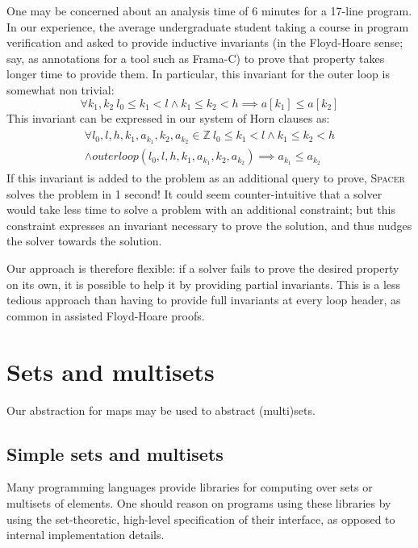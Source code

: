 \documentclass[a4paper]{article}
\newcommand{\ZZ}{\mathbb{Z}}
\newcommand{\soft}[1]{\textsc{#1}}
\theoremstyle{definition}
\theoremstyle{plain}
\begin{document}
One may be concerned about an analysis time of 6 minutes for a 17-line program.
In our experience, the average undergraduate student taking a course in program verification and asked to provide inductive invariants (in the Floyd-Hoare sense; say, as annotations for a tool such as Frama-C) to prove that property takes longer time to provide them.
In particular, this invariant for the outer loop is somewhat non trivial:
\begin{equation}
\forall k_1,k_2~ l_0 \leq k_1 < l \land k_1 \leq k_2 < h
\implies a[k_1] \leq a[k_2]
\end{equation}
This invariant can be expressed in our system of Horn clauses as:
\begin{align}
\begin{aligned}
\forall l_0,l,h,k_1,a_{k_1},k_2,a_{k_2} \in \ZZ~
  l_0 \leq k_1 < l \land k_1 \leq k_2 < h \\ \land
  \mathit{outerloop}(l_0,l,h,k_1,a_{k_1},k_2,a_{k_2})
  \implies a_{k_1} \leq a_{k_2}
\end{aligned}\label{formula:outerloop_invariant}
\end{align}
If this invariant is added to the problem as an additional query to prove, \soft{Spacer} solves the problem in 1 second!
It could seem counter-intuitive that a solver would take less time to solve a problem with an additional constraint; but this constraint expresses an invariant necessary to prove the solution, and thus nudges the solver towards the solution.

Our approach is therefore flexible: if a solver fails to prove the desired property on its own, it is possible to help it by providing partial invariants. This is a less tedious approach than having to provide full invariants at every loop header, as common in assisted Floyd-Hoare proofs.

\section{Sets and multisets}
Our abstraction for maps may be used to abstract (multi)sets.

\subsection{Simple sets and multisets}\label{sec:simple_sets}
Many programming languages provide libraries for computing over sets or multisets of elements. One should reason on programs using these libraries by using the set-theoretic, high-level specification of their interface, as opposed to internal implementation details.
\end{document}
